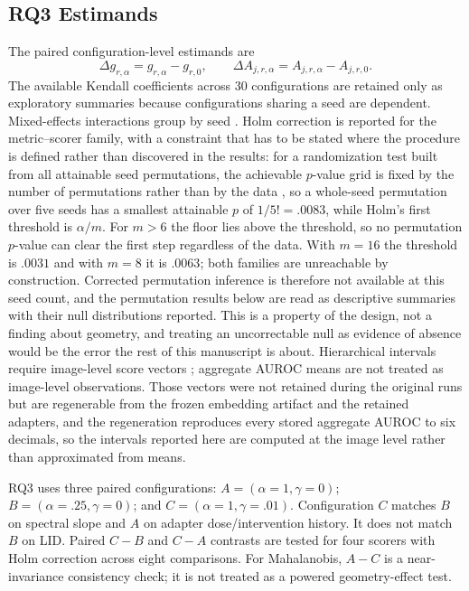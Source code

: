 \documentclass[pdflatex,sn-basic]{sn-jnl}
\theoremstyle{plain}
\theoremstyle{definition}
\theoremstyle{remark}
\begin{document}
\subsection{RQ3 Estimands}
The paired configuration-level estimands are
\begin{equation}
\Delta g_{r,\alpha}=g_{r,\alpha}-g_{r,0},\qquad
\Delta A_{j,r,\alpha}=A_{j,r,\alpha}-A_{j,r,0}.
\end{equation}
The available Kendall coefficients across 30 configurations are retained only as exploratory summaries because configurations sharing a seed are dependent. Mixed-effects interactions group by seed \citep{bates2015fitting}. Holm correction \citep{holm1979simple} is reported for the metric--scorer family, with a constraint that has to be stated where the procedure is defined rather than discovered in the results: for a randomization test built from all attainable seed permutations, the achievable $p$-value grid is fixed by the number of permutations rather than by the data \citep{edgington2007randomization}, so a whole-seed permutation over five seeds has a smallest attainable $p$ of $1/5!=.0083$, while Holm's first threshold is $\alpha/m$. For $m>6$ the floor lies above the threshold, so no permutation $p$-value can clear the first step regardless of the data. With $m=16$ the threshold is $.0031$ and with $m=8$ it is $.0063$; both families are unreachable by construction. Corrected permutation inference is therefore not available at this seed count, and the permutation results below are read as descriptive summaries with their null distributions reported. This is a property of the design, not a finding about geometry, and treating an uncorrectable null as evidence of absence would be the error the rest of this manuscript is about. Hierarchical intervals require image-level score vectors \citep{saravanan2020application}; aggregate AUROC means are not treated as image-level observations. Those vectors were not retained during the original runs but are regenerable from the frozen embedding artifact and the retained adapters, and the regeneration reproduces every stored aggregate AUROC to six decimals, so the intervals reported here are computed at the image level rather than approximated from means.

RQ3 uses three paired configurations: $A=(\alpha=1,\gamma=0)$; $B=(\alpha=.25,\gamma=0)$; and $C=(\alpha=1,\gamma=.01)$. Configuration $C$ matches $B$ on spectral slope and $A$ on adapter dose/intervention history. It does not match $B$ on LID. Paired $C-B$ and $C-A$ contrasts are tested for four scorers with Holm correction across eight comparisons. For Mahalanobis, $A-C$ is a near-invariance consistency check; it is not treated as a powered geometry-effect test.
\end{document}
